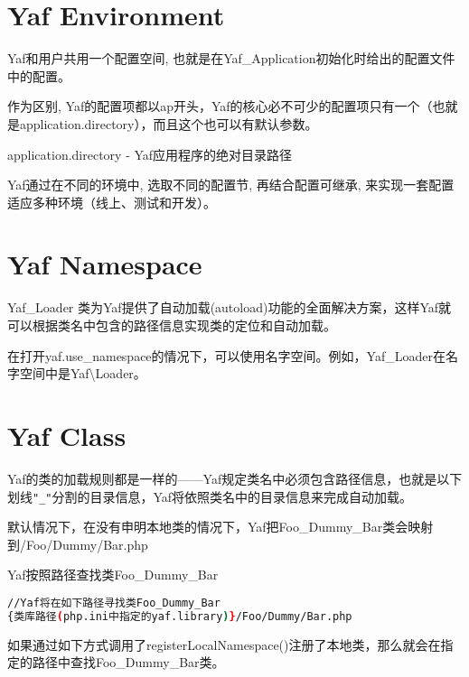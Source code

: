 \chapter{Yaf Environment}


Yaf和用户共用一个配置空间, 也就是在Yaf\_Application初始化时给出的配置文件中的配置。

作为区别, Yaf的配置项都以ap开头，Yaf的核心必不可少的配置项只有一个（也就是application.directory），而且这个也可以有默认参数。

\begin{compactitem}
\item application.directory - Yaf应用程序的绝对目录路径
\end{compactitem}



Yaf通过在不同的环境中, 选取不同的配置节, 再结合配置可继承, 来实现一套配置适应多种环境（线上、测试和开发）。

\chapter{Yaf Namespace}

Yaf\_Loader 类为Yaf提供了自动加载(autoload)功能的全面解决方案，这样Yaf就可以根据类名中包含的路径信息实现类的定位和自动加载。

在打开yaf.use\_namespace的情况下，可以使用名字空间。例如，Yaf\_Loader在名字空间中是Yaf\textbackslash Loader。




\chapter{Yaf Class}


Yaf的类的加载规则都是一样的——Yaf规定类名中必须包含路径信息，也就是以下划线\texttt{"\_"}分割的目录信息，Yaf将依照类名中的目录信息来完成自动加载。

默认情况下，在没有申明本地类的情况下，Yaf把Foo\_Dummy\_Bar类会映射到/Foo/Dummy/Bar.php

\begin{example}
Yaf按照路径查找类Foo\_Dummy\_Bar
\begin{lstlisting}[language=bash]
//Yaf将在如下路径寻找类Foo_Dummy_Bar
{类库路径(php.ini中指定的yaf.library)}/Foo/Dummy/Bar.php
\end{lstlisting}
\end{example}

如果通过如下方式调用了registerLocalNamespace()注册了本地类，那么就会在指定的路径中查找Foo\_Dummy\_Bar类。

